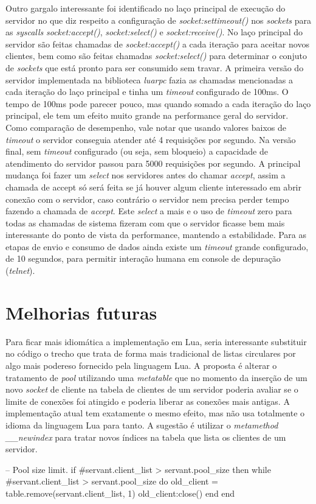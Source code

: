 \documentclass[11pt]{article}
\begin{document}
Outro gargalo interessante foi identificado no laço principal de execução do
servidor no que diz respeito a configuração de \textit{socket:settimeout()} nos
\textit{sockets} para as \textit{syscalls} \textit{socket:accept()},
\textit{socket:select()} e \textit{socket:receive()}. No laço principal do
servidor são feitas chamadas de \textit{socket:accept()} a cada iteração para
aceitar novos clientes, bem como são feitas chamadas \textit{socket:select()}
para determinar o conjuto de \textit{sockets} que está pronto para ser consumido
sem travar. A primeira versão do servidor implementada na biblioteca
\textit{luarpc} fazia as chamadas mencionadas a cada iteração do laço principal
e tinha um \textit{timeout} configurado de 100ms. O tempo de 100ms pode parecer
pouco, mas quando somado a cada iteração do laço principal, ele tem um efeito
muito grande na performance geral do servidor. Como comparação de desempenho,
vale notar que usando valores baixos de \textit{timeout} o servidor conseguia
atender até 4 requisições por segundo. Na versão final, sem \textit{timeout}
configurado (ou seja, sem bloqueio) a capacidade de atendimento do servidor
passou para 5000 requisições por segundo. A principal mudança foi fazer um
\textit{select} nos servidores antes do chamar \textit{accept}, assim a chamada
de accept só será feita se já houver algum cliente interessado em abrir conexão
com o servidor, caso contrário o servidor nem precisa perder tempo fazendo a
chamada de \textit{accept}. Este \textit{select} a mais e o uso de
\textit{timeout} zero para todas as chamadas de sistema fizeram com que o
servidor ficasse bem mais interessante do ponto de vista da performance,
mantendo a estabilidade. Para as etapas de envio e consumo de dados ainda existe
um \textit{timeout} grande configurado, de 10 segundos, para permitir interação
humana em console de depuração (\textit{telnet}).

\section{Melhorias futuras}\label{sec:future}

Para ficar mais idiomática a implementação em Lua, seria interessante
substituir no código o trecho que trata de forma mais tradicional de listas
circulares por algo mais podereso fornecido pela linguagem Lua. A proposta é
alterar o tratamento de \textit{pool} utilizando uma
\textit{metatable}\cite{metat} que no momento da inserção de um novo
\textit{socket} de cliente na tabela de clientes de um servidor poderia avaliar
se o limite de conexões foi atingido e poderia liberar as conexões mais
antigas. A implementação atual tem exatamente o mesmo efeito, mas não usa
totalmente o idioma da linguagem Lua para tanto. A sugestão é utilizar o
\textit{metamethod} \textit{__newindex} para tratar novos índices na tabela que
lista os clientes de um servidor.

-- Pool size limit.
if #servant.client_list > servant.pool_size then
while #servant.client_list > servant.pool_size do
old_client = table.remove(servant.client_list, 1)
old_client:close()
end
end



\end{document}
